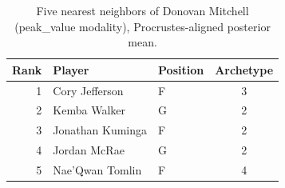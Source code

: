 \begin{table}[htbp]
  \centering\small
  \begin{tabular}{rllc}
    \toprule
    Rank & Player & Position & Archetype \\
    \midrule
    1 & Cory Jefferson & F & 3 \\
    2 & Kemba Walker & G & 2 \\
    3 & Jonathan Kuminga & F & 2 \\
    4 & Jordan McRae & G & 2 \\
    5 & Nae'Qwan Tomlin & F & 4 \\
    \bottomrule
  \end{tabular}
  \caption{Five nearest neighbors of Donovan Mitchell (peak_value modality), Procrustes-aligned posterior mean.}
  \label{tab:Donovan_Mitchell_neighbors_peak_value}
\end{table}

